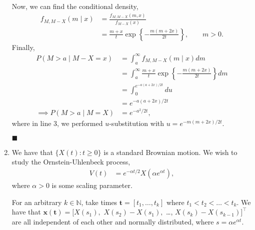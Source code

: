 \documentclass[11pt]{article}
\begin{document}
\begin{enumerate}
Now, we can find the conditional density,
\begin{align*}
	f_{M, M-X} (m \mid x) &= \frac{f_{M, M-X}(m, x)}{f_{M-X}(x)} \\
	&= \frac{m+x}{t} \exp \left\{ - \frac{m(m + 2x)}{2t} \right\}, \qquad m > 0.
\end{align*}
Finally,
\begin{align*}
	P(M > a \mid M - X = x) &= \int_a^{\infty} f_{M, M-X}(m \mid x) dm \\
	&= \int_a^{\infty} \frac{m+x}{t} \exp \left\{ - \frac{m(m + 2x)}{2t} \right\} dm \\
	&= \int_0^{e^{-a(a+2x)/2t}} du \\
	&= e^{-a(a+2x)/2t} \\
	\implies P(M > a \mid M = X) &= e^{-a^2 / 2t},
\end{align*}
where in line 3, we performed $u$-substitution with $u = e^{-m(m+2x)/2t}$.

\hfill $\blacksquare$

\clearpage

\item We have that $\{X(t) : t \geq 0\}$ is a standard Brownian motion. We wish to study the Ornstein-Uhlenbeck process,
\begin{align*}
	V(t) &= e^{-\alpha t / 2} X(\alpha e^{\alpha t}),
\end{align*}
where $\alpha > 0$ is some scaling parameter.

For an arbitrary $k \in \mathbb{N}$, take times $\mathbf{t} = [t_1, \dots, t_k]$ where $t_1 < t_2 < \dots < t_k$. We have that $\mathbf{x}(\mathbf{t}) = [X(s_1),$ $X(s_2) - X(s_1),$ \dots, $X(s_k) - X(s_{k-1})]^{\top}$ are all independent of each other and normally distributed, where $s = \alpha e^{\alpha t}$.


\end{enumerate}
\end{document}
